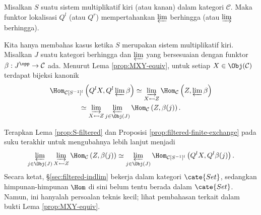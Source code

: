 \begin{lema}\label{prop:localization-prod}
	Misalkan $S$ suatu sistem multiplikatif kiri (atau kanan) dalam kategori
	$\mathcal{C}$. Maka funktor lokalisasi $Q^l$ (atau $Q^r$) mempertahankan
	$\varprojlim$ berhingga (atau $\varinjlim$ berhingga).
\end{lema}
\begin{bukti}
	Kita hanya membahas kasus ketika $S$ merupakan sistem multiplikatif kiri.
	Misalkan $J$ suatu kategori berhingga dan $\varprojlim$ yang bersesuaian
	dengan funktor $\beta:J^{\opp}\to\mathcal{C}$ ada. Menurut Lema
	\ref{prop:MXY-equiv}, untuk setiap $X\in\Obj(\mathcal{C})$ terdapat
	bijeksi kanonik
	\begin{multline*}
		\Hom_{\mathcal{C}[S^{-1}]^l} \left( Q^l X, Q^l \varprojlim \beta \right) \simeq \varinjlim_{X \leftarrowtail Z} \Hom_{\mathcal{C}}\left( Z, \varprojlim \beta \right) \\
		\simeq \varinjlim_{X \leftarrowtail Z} \varprojlim_{j \in \Obj(J)} \Hom_{\mathcal{C}}\left( Z, \beta(j) \right).
	\end{multline*}

	Terapkan Lema \ref{prop:S-filtered} dan Proposisi
	\ref{prop:filtered-finite-exchange} pada suku terakhir untuk
	mengubahnya lebih lanjut menjadi
	\[ \varprojlim_{j \in \Obj(J)} \varinjlim_{X \leftarrowtail Z} \Hom_{\mathcal{C}}\left( Z, \beta(j) \right) \simeq \varprojlim_{j \in \Obj(J)} \Hom_{\mathcal{C}[S^{-1}]^l} \left(Q^l X, Q^l \beta(j) \right). \]
	Secara ketat, \S\ref{sec:filtered-indlim} bekerja dalam kategori
	$\cate{Set}$, sedangkan himpunan-himpunan $\Hom$ di sini belum tentu berada
	dalam $\cate{Set}$. Namun, ini hanyalah persoalan teknis kecil; lihat
	pembahasan terkait dalam bukti Lema \ref{prop:MXY-equiv}.
\end{bukti}

